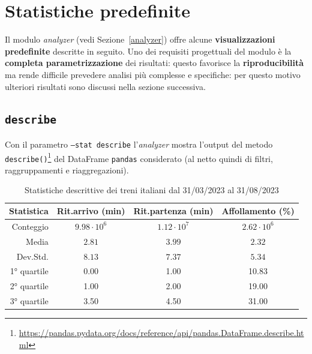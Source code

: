\documentclass[12pt,italian]{report}
\begin{document}
\section{Statistiche predefinite}

Il modulo \textit{analyzer} (vedi Sezione~\ref{analyzer}) offre alcune
\textbf{visualizzazioni predefinite} descritte in seguito.  Uno dei
requisiti progettuali del modulo è la \textbf{completa
    parametrizzazione} dei risultati: questo favorisce la
\textbf{riproducibilità} ma rende difficile prevedere analisi più
complesse e specifiche: per questo motivo ulteriori risultati sono
discussi nella sezione successiva.

\subsection{\texttt{describe}}

Con il parametro \texttt{--stat describe} l'\textit{analyzer} mostra
l'output del metodo
\texttt{describe()}\footnote{\href{https://pandas.pydata.org/docs/reference/api/pandas.DataFrame.describe.html}{https://pandas.pydata.org/docs/reference/api/pandas.DataFrame.describe.html}}
del DataFrame \texttt{pandas} considerato (al netto quindi di filtri,
raggruppamenti e riaggregazioni).


\begin{table}[h]
    \begin{tabular}{r|ccc}
      \textbf{Statistica} & \textbf{Rit.\@ arrivo} (min) & \textbf{Rit.\@ partenza} (min) & \textbf{Affollamento} (\%)
      \\ \hline Conteggio & $9.98 \cdot 10^6$ & $1.12 \cdot 10^7$  & $2.62 \cdot 10^6$
      \\ Media & $2.81$ & $3.99$ & $2.32$
      \\ Dev.\@ Std.\@ & $8.13$ & $7.37$ & $5.34$
      \\ 1° quartile & 0.00 & 1.00 & 10.83
      \\ 2° quartile & 1.00 & 2.00 & 19.00
      \\ 3° quartile & 3.50 & 4.50 & 31.00 
    \end{tabular}
    \caption{Statistiche descrittive dei treni italiani dal 31/03/2023
        al 31/08/2023}
    \label{table:describe}
\end{table}
\end{document}
